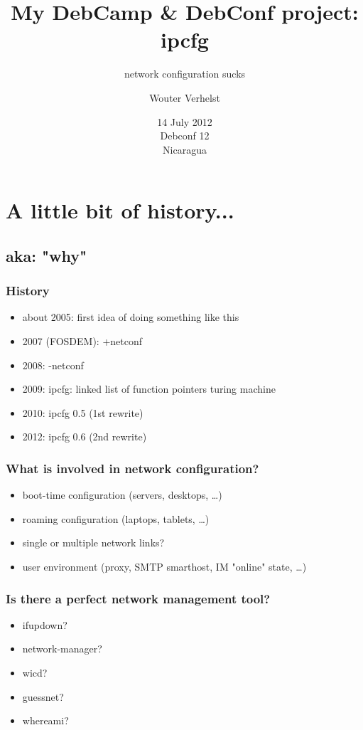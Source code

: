\documentclass[ignorenonframetext]{beamer}
\title{My DebCamp \& DebConf project: ipcfg}
\subtitle{network configuration sucks}
\author{Wouter Verhelst}
\date{14 July 2012 \\ Debconf 12 \\ Nicaragua}
\begin{document}

\section{A little bit of history...}
\subsection{aka: "why"}
\begin{frame}
  \frametitle{History}
  \begin{itemize}
    \item about 2005: first idea of doing something like this
    \item 2007 (FOSDEM): +netconf
    \item 2008: -netconf
    \item 2009: ipcfg: linked list of function pointers turing machine
    \item 2010: ipcfg 0.5 (1st rewrite)
    \item 2012: ipcfg 0.6 (2nd rewrite)
  \end{itemize}
\end{frame}

\begin{frame}
  \frametitle{What is involved in network configuration?}
  \begin{itemize}
    \item boot-time configuration (servers, desktops, \ldots)
    \item roaming configuration (laptops, tablets, \ldots)
    \item single or multiple network links?
    \item user environment (proxy, SMTP smarthost, IM "online" state, \ldots)
  \end{itemize}
\end{frame}

\begin{frame}
  \frametitle{Is there a perfect network management tool?}
  \begin{itemize}
    \item ifupdown? %
    \item network-manager? %
    \item wicd? %
    \item guessnet? %
    \item whereami? %
  \end{itemize}
\end{frame}
\end{document}
